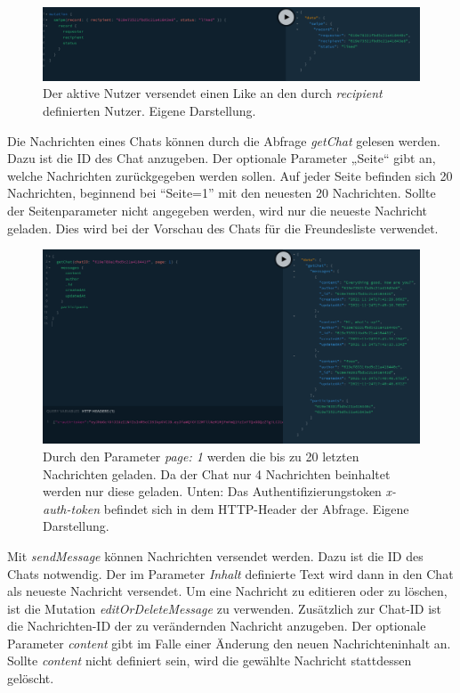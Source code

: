 \begin{figure}
	\centering
    \includegraphics[width=\textwidth]{sources/graphiql_swipe.png}
	\caption{Der aktive Nutzer versendet einen Like an den durch \textit{recipient} definierten Nutzer. Eigene Darstellung.}
	\label{fig:gql:6}
\end{figure}

Die Nachrichten eines Chats können durch die Abfrage \textit{getChat} gelesen werden.
Dazu ist die ID des Chat anzugeben.
Der optionale Parameter „Seite“ gibt an, welche Nachrichten zurückgegeben werden sollen.
Auf jeder Seite befinden sich 20 Nachrichten, beginnend bei \enquote{Seite=1} mit den neuesten 20 Nachrichten.
Sollte der Seitenparameter nicht angegeben werden, wird nur die neueste Nachricht geladen.
Dies wird bei der Vorschau des Chats für die Freundesliste verwendet.

\begin{figure}
	\centering
    \includegraphics[width=\textwidth]{sources/graphiql_getChat.png}
	\caption{Durch den Parameter \textit{page: 1} werden die bis zu 20 letzten Nachrichten geladen. Da der Chat nur 4 Nachrichten beinhaltet werden nur diese geladen. Unten: Das Authentifizierungstoken \textit{x-auth-token} befindet sich in dem HTTP-Header der Abfrage. Eigene Darstellung.}
	\label{fig:gql:7}
\end{figure}

Mit \textit{sendMessage} können Nachrichten versendet werden. Dazu ist die ID des Chats notwendig.
Der im Parameter \textit{Inhalt} definierte Text wird dann in den Chat als neueste Nachricht versendet.
Um eine Nachricht zu editieren  oder zu löschen, ist die Mutation \textit{editOrDeleteMessage} zu verwenden.
Zusätzlich zur Chat-ID ist die Nachrichten-ID der zu verändernden Nachricht anzugeben. Der optionale Parameter \textit{content} gibt im Falle einer Änderung den neuen Nachrichteninhalt an.
Sollte \textit{content} nicht definiert sein, wird die gewählte Nachricht stattdessen gelöscht. 

